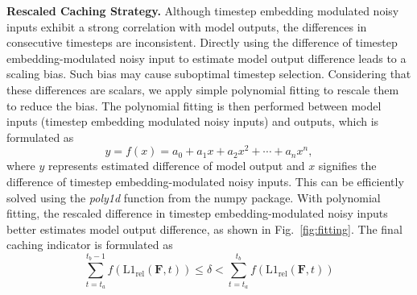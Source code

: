 \textbf{Rescaled Caching Strategy.} Although timestep embedding modulated noisy inputs exhibit a strong correlation with model outputs, the differences in consecutive timesteps are inconsistent. Directly using the difference of timestep embedding-modulated noisy input to estimate model output difference leads to a scaling bias. Such bias may cause suboptimal timestep selection. Considering that these differences are scalars, we apply simple polynomial fitting to rescale them to reduce the bias. The polynomial fitting is then performed between model inputs (timestep embedding modulated noisy inputs) and outputs, which is formulated as 
\begin{equation}
    y = f(x) = a_0 + a_1 x + a_2 x^2 + \cdots + a_n x^n,
\end{equation}
where $y$ represents estimated difference of model output and $x$ signifies the difference of timestep embedding-modulated noisy inputs. This can be efficiently solved using the \textit{poly1d} function from the numpy package.
With polynomial fitting, the rescaled difference in timestep embedding-modulated noisy inputs better estimates model output difference, as shown in Fig.~\ref{fig:fitting}. The final caching indicator is formulated as
\begin{equation}
\sum_{t=t_a}^{t_b-1} f(\text{L1}_{\text{rel}}(\mathbf{F}, t)) \leq \delta < \sum_{t=t_a}^{t_b} f(\text{L1}_{\text{rel}}(\mathbf{F}, t))
\end{equation}




